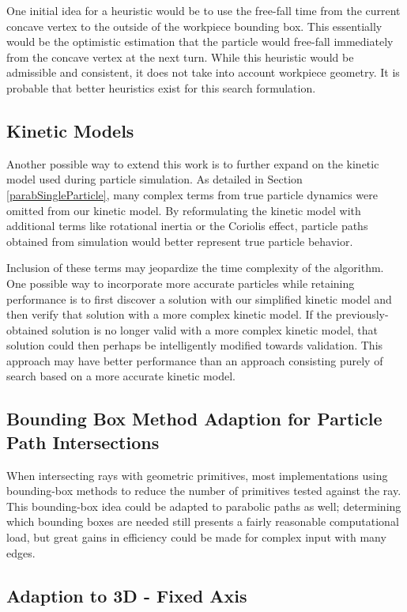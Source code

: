 One initial idea for a heuristic would be to use the free-fall time from the current concave vertex to the outside of the workpiece bounding box. This essentially would be the optimistic estimation that the particle would free-fall immediately from the concave vertex at the next turn. While this heuristic would be admissible and consistent, it does not take into account workpiece geometry. It is probable that better heuristics exist for this search formulation.

  \subsection{Kinetic Models}

Another possible way to extend this work is to further expand on the kinetic model used during particle simulation. As detailed in Section \ref{parabSingleParticle}, many complex terms from true particle dynamics were omitted from our kinetic model. By reformulating the kinetic model with additional terms like rotational inertia or the Coriolis effect, particle paths obtained from simulation would better represent true particle behavior.

Inclusion of these terms may jeopardize the time complexity of the algorithm. One possible way to incorporate more accurate particles while retaining performance is to first discover a solution with our simplified kinetic model and then verify that solution with a more complex kinetic model. If the previously-obtained solution is no longer valid with a more complex kinetic model, that solution could then perhaps be intelligently modified towards validation. This approach may have better performance than an approach consisting purely of search based on a more accurate kinetic model.

  \subsection{Bounding Box Method Adaption for Particle Path Intersections}

When intersecting rays with geometric primitives, most implementations using bounding-box methods to reduce the number of primitives tested against the ray. This bounding-box idea could be adapted to parabolic paths as well; determining which bounding boxes are needed still presents a fairly reasonable computational load, but great gains in efficiency could be made for complex input with many edges.

  \subsection{Adaption to 3D - Fixed Axis}

